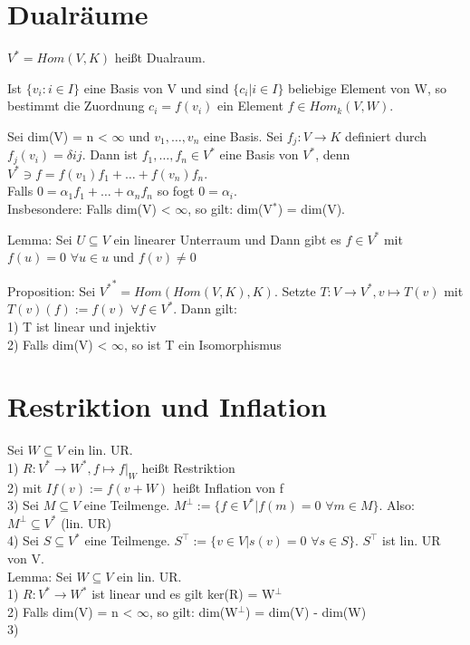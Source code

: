 \documentclass[fontsize=10pt]{scrartcl}
\begin{document}
\section{Dualräume}
$V^* = Hom(V, K)$ heißt Dualraum.
\begin{compactitem}
\item Ist $\{ v_i : i \in I \}$ eine Basis von V und sind $\{ c_i | i \in I \}$ beliebige Element von W, so bestimmt die Zuordnung $c_i = f(v_i)$ ein Element $f \in Hom_k(V,W)$.
\item Sei dim(V) = n < $\infty$ und $v_1, …, v_n$ eine Basis. Sei $f_j: V \to K$ definiert durch $f_j(v_i) = \delta{ij}$. Dann ist $f_1, …, f_n \in V^*$ eine Basis von $V^*$, denn $V^* \ni f = f(v_1)f_1 + … + f(v_n)f_n$.\\
Falls $0 = \alpha_1 f_1 + … + \alpha_n f_n$ so fogt $0 = \alpha_i$.\\
Insbesondere: Falls dim(V) < $\infty$, so gilt: dim(V$^*$) = dim(V).\\
\item Lemma: Sei $U \subseteq V$ ein linearer Unterraum und %
Dann gibt es $f \in V^*$ mit $f(u) = 0$ $\forall u \in u$ und $f(v) \neq 0$
\item Proposition: Sei ${V^*}^* = Hom(Hom(V,K), K)$. Setzte $T: V \to V^*, v \mapsto T(v)$ mit $T(v)(f) := f(v)$ $\forall f \in V^*$. Dann gilt:\\
1) T ist linear und injektiv\\
2) Falls dim(V) < $\infty$, so ist T ein Isomorphismus
\end{compactitem}

\section{Restriktion und Inflation}
Sei $W \subseteq V$ ein lin. UR.\\
1) $R: V^* \to W^*, f \mapsto f|_W$ heißt Restriktion\\
2) %
mit $If(v) := f(v + W)$ heißt Inflation von f\\
3) Sei $M \subseteq V$ eine Teilmenge. $M^\perp := \{ f \in V^* | f(m) = 0$ $\forall m \in M \}$. Also: $M^\perp \subseteq V^*$ (lin. UR)\\
4) Sei $S \subseteq V^*$ eine Teilmenge. $S^\top := \{ v \in V | s(v) = 0$ $\forall s \in S \}$. $S^\top$ ist lin. UR von V.\\
Lemma: Sei $W \subseteq V$ ein lin. UR.\\
1) $R: V^* \to W^*$ ist linear und es gilt ker(R) = W$^\perp$\\
2) Falls dim(V) = n < $\infty$, so gilt: dim(W$^\perp$) = dim(V) - dim(W)\\
3) %
\end{document}

